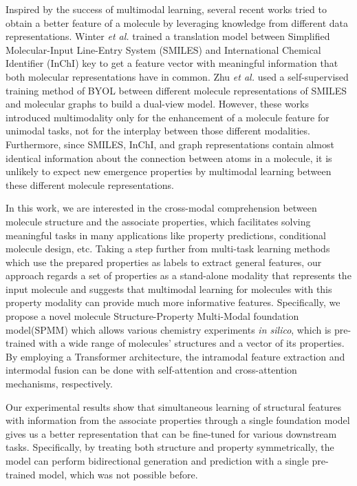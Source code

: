 \documentclass{nature_meth}
\newcommand{\1}{\blmath{1}}
\newcommand{\0}{\blmath{0}}
\begin{document}
Inspired by the success of multimodal learning, several recent works tried to obtain a better feature of a molecule by leveraging knowledge from different data representations. Winter \emph{et al.} trained a translation model between Simplified Molecular-Input Line-Entry System (SMILES) and International Chemical Identifier (InChI) key to get a feature vector with meaningful information that both molecular representations have in common\cite{smiles_inchi_vae}. Zhu \emph{et al.} used a self-supervised training method of BYOL\cite{byol} between different molecule representations of SMILES and molecular graphs to build a dual-view model\cite{graph-smiles}. However, these works introduced multimodality only for the enhancement of a molecule feature for unimodal tasks, not for the interplay between those different modalities. Furthermore, since SMILES, InChI, and graph representations contain almost identical information about the connection between atoms in a molecule, it is unlikely to expect new emergence properties by multimodal learning between these different molecule representations.

In this work, we are interested in the cross-modal comprehension between molecule structure and the associate properties, which facilitates solving meaningful tasks in many applications like property predictions, conditional molecule design\cite{denovo_review, inverseQSAR}, etc.
Taking a step further from multi-task learning methods\cite{multitask} which use the prepared properties as labels to extract general features\cite{chemberta2}, our approach regards a set of properties as a stand-alone modality that represents the input molecule and suggests that multimodal learning for molecules with this property modality can provide much more informative features.
Specifically, we propose a novel molecule Structure-Property Multi-Modal foundation model(SPMM) which allows various chemistry experiments {\em in silico}, which is pre-trained with a wide range of molecules' structures and a vector of its properties. By employing a Transformer architecture\cite{transformer}, the intramodal feature extraction and intermodal fusion can be done with self-attention and cross-attention mechanisms, respectively.

Our experimental results show that simultaneous learning of structural features with information from the associate properties through a single foundation model gives us a better representation that can be fine-tuned for various downstream tasks. Specifically, by treating both structure and property symmetrically, the model can perform bidirectional generation and prediction with a single pre-trained model, which was not possible before.
\end{document}
